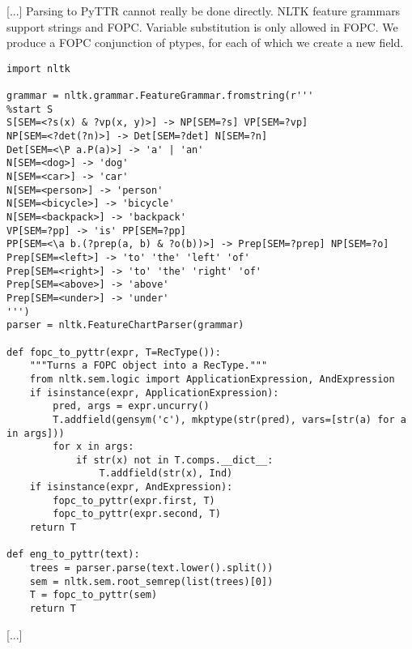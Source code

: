 [...]
 Parsing to PyTTR cannot really be done directly. NLTK feature grammars support strings and FOPC. Variable substitution is only allowed in FOPC. We produce a FOPC conjunction of ptypes, for each of which we create a new field.

\begin{lstlisting}[label=lst:grammar, caption=Basic parsing of natural language into PyTTR object.]
import nltk

grammar = nltk.grammar.FeatureGrammar.fromstring(r'''
%start S
S[SEM=<?s(x) & ?vp(x, y)>] -> NP[SEM=?s] VP[SEM=?vp]
NP[SEM=<?det(?n)>] -> Det[SEM=?det] N[SEM=?n]
Det[SEM=<\P a.P(a)>] -> 'a' | 'an'
N[SEM=<dog>] -> 'dog'
N[SEM=<car>] -> 'car'
N[SEM=<person>] -> 'person'
N[SEM=<bicycle>] -> 'bicycle'
N[SEM=<backpack>] -> 'backpack'
VP[SEM=?pp] -> 'is' PP[SEM=?pp]
PP[SEM=<\a b.(?prep(a, b) & ?o(b))>] -> Prep[SEM=?prep] NP[SEM=?o]
Prep[SEM=<left>] -> 'to' 'the' 'left' 'of'
Prep[SEM=<right>] -> 'to' 'the' 'right' 'of'
Prep[SEM=<above>] -> 'above'
Prep[SEM=<under>] -> 'under'
''')
parser = nltk.FeatureChartParser(grammar)

def fopc_to_pyttr(expr, T=RecType()):
    """Turns a FOPC object into a RecType."""
    from nltk.sem.logic import ApplicationExpression, AndExpression
    if isinstance(expr, ApplicationExpression):
        pred, args = expr.uncurry()
        T.addfield(gensym('c'), mkptype(str(pred), vars=[str(a) for a in args]))
        for x in args:
            if str(x) not in T.comps.__dict__:
                T.addfield(str(x), Ind)
    if isinstance(expr, AndExpression):
        fopc_to_pyttr(expr.first, T)
        fopc_to_pyttr(expr.second, T)
    return T

def eng_to_pyttr(text):
    trees = parser.parse(text.lower().split())
    sem = nltk.sem.root_semrep(list(trees)[0])
    T = fopc_to_pyttr(sem)
    return T
\end{lstlisting}

[...]


